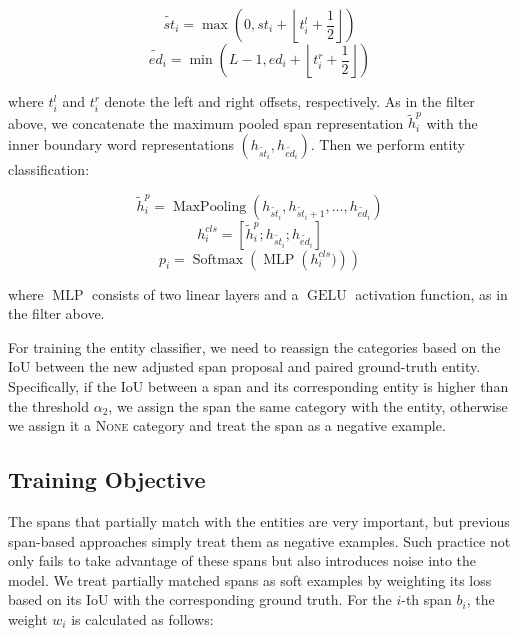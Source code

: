 \documentclass[11pt,a4paper]{article}
\begin{document}
\begin{equation}
    \widetilde{st}_i = \operatorname{max}(0, st_i + \left\lfloor t_i^{l}+\frac{1}{2}\right\rfloor)
\end{equation}
\begin{equation}
    \widetilde{ed}_i = \operatorname{min}(L-1, ed_i + \left\lfloor t_i^{r}+\frac{1}{2}\right\rfloor )
\end{equation}

\noindent where $t_i^{l}$ and $t_i^{r}$ denote the left and right offsets, respectively. As in the filter above, we concatenate the maximum pooled span representation $\widetilde{h}^p_i$ with the inner boundary word representations $(h_{\widetilde{st}_i}, h_{\widetilde{ed}_i})$. Then we perform entity classification:

\begin{equation}
    \widetilde{h}^p_i = \operatorname{MaxPooling}(h_{\widetilde{st}_i}, h_{\widetilde{st}_i+1}, \dots, h_{\widetilde{ed}_i})
\end{equation}
\begin{equation}
    h^{cls}_i = [\widetilde{h}^p_i;h_{\widetilde{st}_i}; h_{\widetilde{ed}_i}]
\end{equation}
\begin{equation}
    p_i = \operatorname{Softmax}\left(\operatorname{MLP}\left(h^{cls}_i )\right)\right)
\end{equation}

\noindent where $\operatorname{MLP}$ consists of two linear layers and a $\operatorname{GELU}$ activation function, as in the filter above.

For training the entity classifier, we need to reassign the categories based on the IoU between the new adjusted span proposal and paired ground-truth entity. Specifically, if the IoU between a span and its corresponding entity is higher than the threshold $\alpha_2$, we assign the span the same category with the entity, otherwise we assign it a \textsc{None} category and treat the span as a negative example. 

\subsection{Training Objective}

The spans that partially match with the entities are very important, but previous span-based approaches simply treat them as negative examples. Such practice not only fails to take advantage of these spans but also introduces noise into the model. We treat partially matched spans as soft examples by weighting its loss based on its IoU with the corresponding ground truth. For the $i$-th span $b_i$, the weight $w_i $ is calculated as follows:
\end{document}
